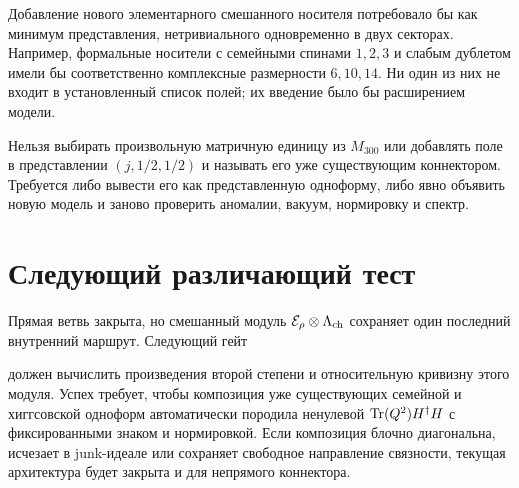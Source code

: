 Добавление нового элементарного смешанного носителя потребовало бы как
минимум представления, нетривиального одновременно в двух секторах.
Например, формальные носители с семейными спинами $1,2,3$ и слабым
дублетом имели бы соответственно комплексные размерности $6,10,14$.
Ни один из них не входит в установленный список полей; их введение было
бы расширением модели.

\begin{nogocriterion}
Нельзя выбирать произвольную матричную единицу из $M_{300}$ или добавлять
поле в представлении $(j,1/2,1/2)$ и называть его уже существующим
коннектором. Требуется либо вывести его как представленную одноформу,
либо явно объявить новую модель и заново проверить аномалии, вакуум,
нормировку и спектр.
\end{nogocriterion}

\section{Следующий различающий тест}

Прямая ветвь закрыта, но смешанный модуль
$\mathcal E_\rho\otimes\Lambda_{\rm ch}$ сохраняет один последний
внутренний маршрут. Следующий гейт
\begin{sloppypar}
\end{sloppypar}
должен вычислить произведения второй степени и относительную кривизну
этого модуля. Успех требует, чтобы композиция уже существующих семейной
и хиггсовской одноформ автоматически породила ненулевой
$\operatorname{Tr}(Q^2)H^\dagger H$ с фиксированными знаком и нормировкой. Если
композиция блочно диагональна, исчезает в junk-идеале или сохраняет
свободное направление связности, текущая архитектура будет закрыта и для
непрямого коннектора.

